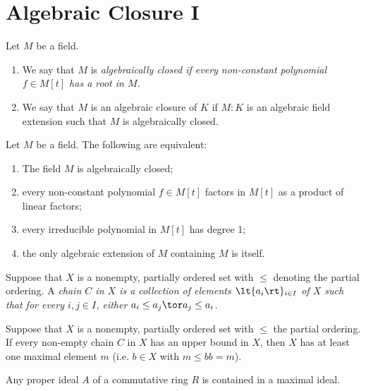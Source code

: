 \documentclass[a4paper]{article}
\begin{document}
\section{Algebraic Closure I}
\begin{tdefinition}
  Let \( M \) be a field. \begin{enumerate}[label=(\roman*)]
    \item We say that \( M \) is \it{algebraically closed} if every non-constant polynomial \( f\in M[t] \) has a root in \( M \).
    \item We say that \( M \) is an algebraic closure of \( K \) if \( M:K \) is an algebraic field extension such that \( M \) is algebraically closed.
  \end{enumerate}
\end{tdefinition}

\begin{tlemma}
  Let \( M \) be a field.
  The following are equivalent: \begin{enumerate}[label=(\roman*)]
    \item The field \( M \) is algebraically closed;
    \item every non-constant polynomial \( f\in M[t] \) factors in \( M[t] \) as a product of linear factors;
    \item every irreducible polynomial in \( M[t] \) has degree 1;
    \item the only algebraic extension of \( M \) containing \( M \) is itself.
  \end{enumerate}
\end{tlemma}

\begin{tdefinition}[Chain]
  Suppose that \( X \) is a nonempty, partially ordered set with \( \leq \) denoting the partial ordering.
  A \it{chain} \( C \) in \( X \) is a collection of elements \( \lt\{ a_i \rt\}_{i\in I} \) of \( X \) such that for every \( i,j\in I \), either \( a_i\leq a_j \tor a_j\leq a_i \).
\end{tdefinition}

\quad Suppose that \( X \) is a nonempty, partially ordered set with \( \leq \) the partial ordering.
If every non-empty chain \( C \) in \( X \) has an upper bound in \( X \), then \( X \) has at least one maximal element \( m \) (i.e. \( b\in X \) with \( m\leq b \)\imp\( b=m \)).

\begin{tcorollary}
  Any proper ideal \( A \) of a commutative ring \( R \) is contained in a maximal ideal.
\end{tcorollary}
\end{document}
